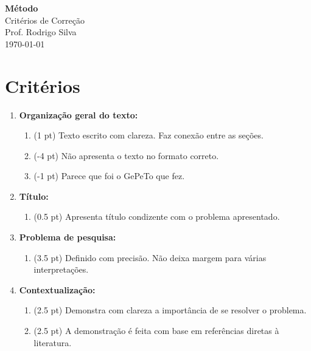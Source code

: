\documentclass[12pt,a4paper, brazil]{article}
\begin{document}
\begin{center}
{\textbf {\huge Método}}\\[5mm]
{\large Critérios de Correção } \\[2mm]
{\large Prof. Rodrigo Silva } \\[5mm]
\today\\[5mm] %
\end{center}



\section*{Critérios}

\begin{enumerate}
    \item \textbf{Organização geral do texto:}
        \begin{enumerate}
            \item (1 pt) Texto escrito com clareza. Faz conexão entre as seções.
            \item (-4 pt) Não apresenta o texto no formato correto.
            \item (-1 pt) Parece que foi o GePeTo que fez.
        \end{enumerate}
    \item \textbf{Título:} 
    \begin{enumerate}
        \item (0.5 pt) Apresenta título condizente com o problema apresentado.
    \end{enumerate}
    \item \textbf{Problema de pesquisa:} 
        \begin{enumerate}
            \item (3.5 pt) Definido com precisão. Não deixa margem para várias interpretações.
        \end{enumerate}
    \item \textbf{Contextualização:} 
        \begin{enumerate}
            \item (2.5 pt) Demonstra com clareza a importância de se resolver o problema.
            \item (2.5 pt) A demonstração é feita com base em referências diretas à literatura. 
        \end{enumerate}
\end{enumerate}
\end{document}
